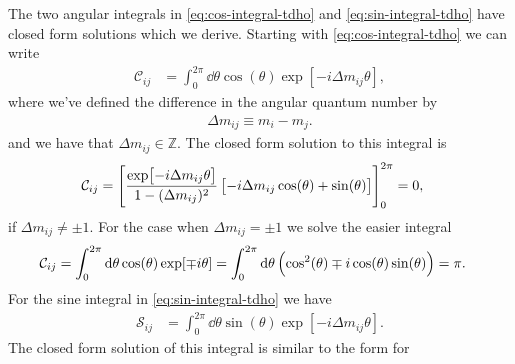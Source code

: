             The two angular integrals in \autoref{eq:cos-integral-tdho} and
            \autoref{eq:sin-integral-tdho} have closed form solutions which we
            derive.
            Starting with \autoref{eq:cos-integral-tdho} we can write
            \begin{align}
                \mathcal{C}_{ij}
                &=
                \int_{0}^{2\pi}
                \dd \theta
                \cos(\theta)
                \exp[-i\Delta m_{ij} \theta],
            \end{align}
            where we've defined the difference in the angular quantum number by
            \begin{align}
                \Delta m_{ij} \equiv m_i - m_j.
            \end{align}
            and we have that $\Delta m_{ij} \in \mathbb{Z}$.
            The closed form solution to this integral is
            \begin{align}
                \mathcal{C}_{ij}
                &= \left[ 
                    \frac{\exp[-i\Delta m_{ij} \theta]}{1 - (\Delta m_{ij})^2}
                    \left[ 
                        -i\Delta m_{ij} \cos(\theta)
                        + \sin(\theta)
                     \right]
                 \right]_{0}^{2\pi}
                = 0,
            \end{align}
            if $\Delta m_{ij} \neq \pm 1$.
            For the case when $\Delta m_{ij} = \pm 1$ we solve the easier
            integral
            \begin{align}
                \mathcal{C}_{ij}
                &=
                \int_{0}^{2\pi}
                \dd \theta
                \cos(\theta) \exp[\mp i\theta]
                =
                \int_{0}^{2\pi}
                \dd \theta
                \left( 
                    \cos^2(\theta)
                    \mp i\cos(\theta)\sin(\theta)
                 \right)
                = \pi.
            \end{align}
            For the sine integral in \autoref{eq:sin-integral-tdho} we have
            \begin{align}
                \mathcal{S}_{ij}
                &=
                \int_{0}^{2\pi}
                \dd\theta
                \sin(\theta)
                \exp[-i\Delta m_{ij} \theta].
            \end{align}
            The closed form solution of this integral is similar to the form for
